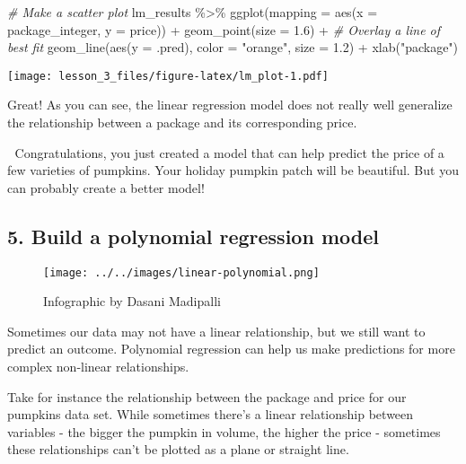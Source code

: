 \documentclass[
]{article}
\newenvironment{Shaded}{\begin{snugshade}}{\end{snugshade}}
\newcommand{\AttributeTok}[1]{\textcolor[rgb]{0.77,0.63,0.00}{#1}}
\newcommand{\CommentTok}[1]{\textcolor[rgb]{0.56,0.35,0.01}{\textit{#1}}}
\newcommand{\FloatTok}[1]{\textcolor[rgb]{0.00,0.00,0.81}{#1}}
\newcommand{\FunctionTok}[1]{\textcolor[rgb]{0.00,0.00,0.00}{#1}}
\newcommand{\NormalTok}[1]{#1}
\newcommand{\SpecialCharTok}[1]{\textcolor[rgb]{0.00,0.00,0.00}{#1}}
\newcommand{\StringTok}[1]{\textcolor[rgb]{0.31,0.60,0.02}{#1}}
\begin{document}
\begin{Shaded}
\begin{Highlighting}[]
\CommentTok{\# Make a scatter plot}
\NormalTok{lm\_results }\SpecialCharTok{\%\textgreater{}\%} 
  \FunctionTok{ggplot}\NormalTok{(}\AttributeTok{mapping =} \FunctionTok{aes}\NormalTok{(}\AttributeTok{x =}\NormalTok{ package\_integer, }\AttributeTok{y =}\NormalTok{ price)) }\SpecialCharTok{+}
  \FunctionTok{geom\_point}\NormalTok{(}\AttributeTok{size =} \FloatTok{1.6}\NormalTok{) }\SpecialCharTok{+}
  \CommentTok{\# Overlay a line of best fit}
  \FunctionTok{geom\_line}\NormalTok{(}\FunctionTok{aes}\NormalTok{(}\AttributeTok{y =}\NormalTok{ .pred), }\AttributeTok{color =} \StringTok{"orange"}\NormalTok{, }\AttributeTok{size =} \FloatTok{1.2}\NormalTok{) }\SpecialCharTok{+}
  \FunctionTok{xlab}\NormalTok{(}\StringTok{"package"}\NormalTok{)}
\end{Highlighting}
\end{Shaded}

\texttt{[image: lesson\_3\_files/figure-latex/lm\_plot-1.pdf]}

Great! As you can see, the linear regression model does not really well
generalize the relationship between a package and its corresponding
price.

🎃 Congratulations, you just created a model that can help predict the
price of a few varieties of pumpkins. Your holiday pumpkin patch will be
beautiful. But you can probably create a better model!

\hypertarget{build-a-polynomial-regression-model}{%
\subsection{5. Build a polynomial regression
model}\label{build-a-polynomial-regression-model}}

\begin{figure}
\centering
\texttt{[image: ../../images/linear-polynomial.png]}
\caption{Infographic by Dasani Madipalli}
\end{figure}

Sometimes our data may not have a linear relationship, but we still want
to predict an outcome. Polynomial regression can help us make
predictions for more complex non-linear relationships.

Take for instance the relationship between the package and price for our
pumpkins data set. While sometimes there's a linear relationship between
variables - the bigger the pumpkin in volume, the higher the price -
sometimes these relationships can't be plotted as a plane or straight
line.
\end{document}
